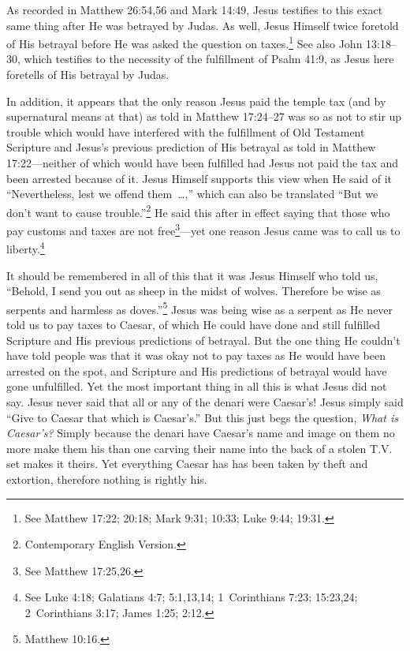 \documentclass[letterpaper,12pt]{article}
\begin{document}
As recorded in Matthew 26:54,56 and Mark 14:49, Jesus testifies to this exact same thing after He was betrayed by Judas. As well, Jesus Himself twice foretold of His betrayal before He was asked the question on taxes.\footnote{See Matthew 17:22; 20:18; Mark 9:31; 10:33; Luke 9:44; 19:31.} See also John 13:18--30, which testifies to the necessity of the fulfillment of Psalm 41:9, as Jesus here foretells of His betrayal by Judas.

In addition, it appears that the only reason Jesus paid the temple tax\label{TempleTax} (and by supernatural means at that) as told in Matthew 17:24--27 was so as not to stir up trouble which would have interfered with the fulfillment of Old Testament Scripture and Jesus's previous prediction of His betrayal as told in Matthew 17:22---neither of which would have been fulfilled had Jesus not paid the tax and been arrested because of it. Jesus Himself supports this view when He said of it ``Nevertheless, lest we offend \mbox{them \ldots,''} which can also be translated ``But we don't want to cause trouble.''\footnote{Contemporary English Version.} He said this after in effect saying that those who pay customs and taxes are not free\footnote{See Matthew 17:25,26.}---yet one reason Jesus came was to call us to liberty.\footnote{See Luke 4:18; Galatians 4:7; 5:1,13,14; 1~Corinthians 7:23; 15:23,24; 2~Corinthians 3:17; James 1:25; 2:12.}

It should be remembered in all of this that it was Jesus Himself who told us, ``Behold, I send you out as sheep in the midst of wolves. Therefore be wise as serpents and harmless as doves.''\footnote{Matthew 10:16.} Jesus was being wise as a serpent as He never told us to pay taxes to Caesar, of which He could have done and still fulfilled Scripture and His previous predictions of betrayal. But the one thing He couldn't have told people was that it was okay not to pay taxes as He would have been arrested on the spot, and Scripture and His predictions of betrayal would have gone unfulfilled. Yet the most important thing in all this is what Jesus did not say. Jesus never said that all or any of the denari were Caesar's! Jesus simply said ``Give to Caesar that which is Caesar's.'' But this just begs the question, \emph{What is Caesar's?} Simply because the denari have Caesar's name and image on them no more make them his than one carving their name into the back of a stolen T.V. set makes it theirs. Yet everything Caesar has has been taken by theft and extortion, therefore nothing is rightly his.
\end{document}

